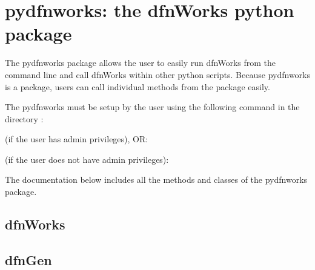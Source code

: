 \documentclass[letterpaper,10pt,english]{sphinxmanual}
\begin{document}
\begin{sphinxVerbatim}[commandchars=\\\{\}]
 

 

 

 

\end{sphinxVerbatim}


\chapter{pydfnworks: the dfnWorks python package}
\label{\detokenize{pydfnworks:dfnworks-python-chapter}}\label{\detokenize{pydfnworks::doc}}\label{\detokenize{pydfnworks:pydfnworks-the-dfnworks-python-package}}
The pydfnworks package allows the user to easily run dfnWorks from the command line and  call dfnWorks within other python scripts. Because pydfnworks is a package, users can call individual methods from the package easily.

The pydfnworks must be setup by the user using the following command in the directory  :

 (if the user has admin privileges), OR:

 (if the user does not have admin privileges):

The documentation below includes all the methods and classes of the pydfnworks package.


\section{dfnWorks}
\label{\detokenize{pydfnworks:dfnworks}}

\section{dfnGen}
\label{\detokenize{pydfnworks:dfngen}}
\end{document}
